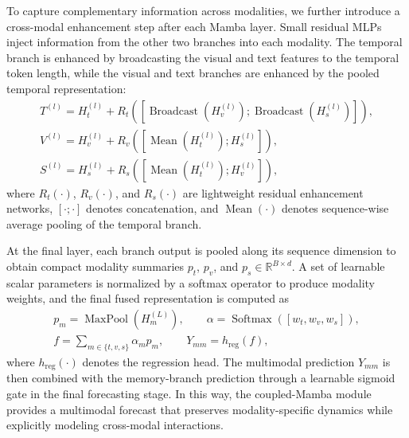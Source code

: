 To capture complementary information across modalities, we further introduce a cross-modal enhancement step after each Mamba layer. Small residual MLPs inject information from the other two branches into each modality. The temporal branch is enhanced by broadcasting the visual and text features to the temporal token length, while the visual and text branches are enhanced by the pooled temporal representation:
\begin{gather}
T^{(l)} = H_t^{(l)} + R_t\!\left([\operatorname{Broadcast}(H_v^{(l)});\operatorname{Broadcast}(H_s^{(l)})]\right), \\
V^{(l)} = H_v^{(l)} + R_v\!\left([\operatorname{Mean}(H_t^{(l)}); H_s^{(l)}]\right), \\
S^{(l)} = H_s^{(l)} + R_s\!\left([\operatorname{Mean}(H_t^{(l)}); H_v^{(l)}]\right),
\end{gather}
where $R_t(\cdot)$, $R_v(\cdot)$, and $R_s(\cdot)$ are lightweight residual enhancement networks, $[\cdot;\cdot]$ denotes concatenation, and $\operatorname{Mean}(\cdot)$ denotes sequence-wise average pooling of the temporal branch.

At the final layer, each branch output is pooled along its sequence dimension to obtain compact modality summaries $p_t$, $p_v$, and $p_s \in \mathbb{R}^{B \times d}$. A set of learnable scalar parameters is normalized by a softmax operator to produce modality weights, and the final fused representation is computed as
\begin{gather}
p_m = \operatorname{MaxPool}\!\left(H_m^{(L)}\right), \qquad
\alpha = \operatorname{Softmax}([w_t,w_v,w_s]), \\
f = \sum_{m \in \{t,v,s\}} \alpha_m p_m, \qquad
Y_{mm} = h_{\mathrm{reg}}(f),
\end{gather}
where $h_{\mathrm{reg}}(\cdot)$ denotes the regression head. The multimodal prediction $Y_{mm}$ is then combined with the memory-branch prediction through a learnable sigmoid gate in the final forecasting stage. In this way, the coupled-Mamba module provides a multimodal forecast that preserves modality-specific dynamics while explicitly modeling cross-modal interactions.

